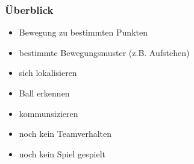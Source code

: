 \frame
{\frametitle{Überblick}
\begin{itemize}
\item Bewegung zu bestimmten Punkten
\item bestimmte Bewegungsmuster (z.B. Aufstehen)
\item sich lokalisieren
\item Ball erkennen
\item kommunsizieren
\item noch kein Teamverhalten
\item noch kein Spiel gespielt
\end{itemize}
}
